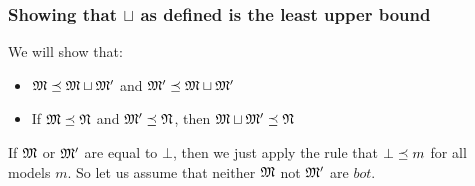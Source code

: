 

\subsubsection{Showing that $\sqcup$ as defined is the least upper bound}
We will show that:
\begin{itemize}
\item
$\frak{M} \preceq \frak{M} \sqcup \frak{M}'$ and $\frak{M}' \preceq \frak{M} \sqcup \frak{M}'$
\item
If $\frak{M} \preceq \frak{N} $ and $\frak{M}' \preceq \frak{N} $, then $\frak{M} \sqcup \frak{M}' \preceq \frak{N}$
\end{itemize}
If $\frak{M}$ or $ \frak{M}'$ are equal to $\bot$, then we just apply the rule that $\bot \preceq m$ for all models $m$. 
So let us assume that neither $\frak{M}$ not $\frak{M}'$ are $bot$.

